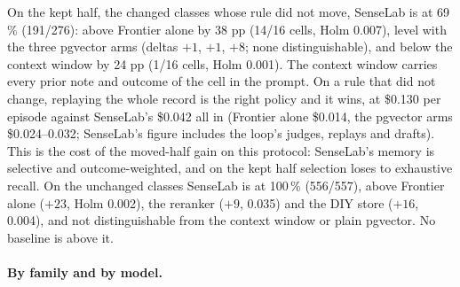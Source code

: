 \documentclass[11pt]{article}
\begin{document}
On the kept half, the changed classes whose rule did not move, SenseLab is at 69\,\% (191/276):
above Frontier alone by 38 pp (14/16 cells, Holm 0.007), level with the three pgvector arms
(deltas $+1$, $+1$, $+8$; none distinguishable), and below the context window by 24 pp (1/16
cells, Holm 0.001). The context window carries every prior note and outcome of the cell in the
prompt. On a rule that did not change, replaying the whole record is the right policy and it
wins, at \$0.130 per episode against SenseLab's \$0.042 all in (Frontier alone \$0.014, the
pgvector arms \$0.024--0.032; SenseLab's figure includes the loop's judges, replays and
drafts). This is the cost of the moved-half gain
on this protocol: SenseLab's memory is selective and outcome-weighted, and on the kept half
selection loses to exhaustive recall. On the unchanged classes SenseLab is at 100\,\% (556/557),
above Frontier alone ($+23$, Holm 0.002), the reranker ($+9$, 0.035) and the DIY store ($+16$,
0.004), and not distinguishable from the context window or plain pgvector. No baseline is above
it.

\paragraph{By family and by model.}
\begin{table}[H]
\centering\scriptsize\setlength{\tabcolsep}{3pt}
\caption{Confirmatory, by family: first-attempt success on the moved half, the kept half and the unchanged classes.}
\label{tab:conf-byfamily}
\end{table}
\end{document}
